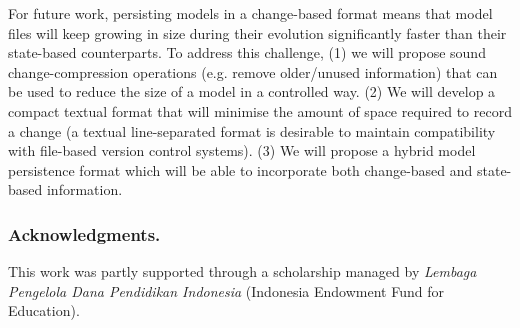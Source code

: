 \documentclass{llncs}
\begin{document}
For future work, persisting models in a change-based format means that model files will keep growing in size during their evolution significantly faster than their state-based counterparts. To address this challenge, (1) we will propose sound change-compression operations (e.g. remove older/unused information) that can be used to reduce the size of a model in a controlled way. (2) We will develop a compact textual format that will minimise the amount of space required to record a change (a textual line-separated format is desirable to maintain compatibility with file-based version control systems). (3) We will propose a hybrid model persistence format which will be able to incorporate both change-based and state-based information. 



\subsubsection*{Acknowledgments.} This work was partly supported through a scholarship managed by \emph{Lembaga Pengelola Dana Pendidikan Indonesia} (Indonesia Endowment Fund for Education).

 

\end{document}
